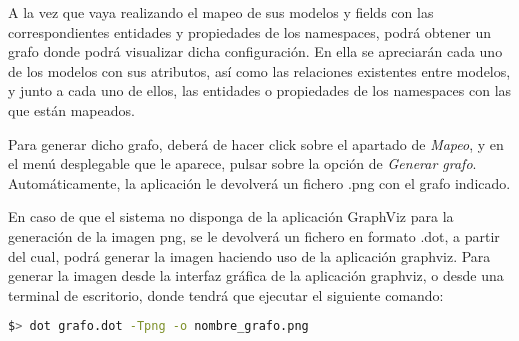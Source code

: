 A la vez que vaya realizando el mapeo de sus modelos y fields con las
correspondientes entidades y propiedades de los namespaces, podrá obtener un
grafo donde podrá visualizar dicha configuración. En ella se apreciarán cada uno
de los modelos con sus atributos, así como las relaciones existentes entre
modelos, y junto a cada uno de ellos, las entidades o propiedades de los
namespaces con las que están mapeados.

Para generar dicho grafo, deberá de hacer click sobre el apartado de
\textit{Mapeo}, y en el menú desplegable que le aparece, pulsar sobre la opción
de \textit{Generar grafo}. Automáticamente, la aplicación le devolverá un
fichero .png con el grafo indicado.

En caso de que el sistema no disponga de la aplicación GraphViz para la
generación de la imagen png, se le devolverá un fichero en formato .dot, a
partir del cual, podrá generar la imagen haciendo uso de la aplicación graphviz.
Para generar la imagen desde la interfaz gráfica de la aplicación graphviz, o
desde una terminal de escritorio, donde tendrá que ejecutar el siguiente
comando:

\begin{lstlisting}[frame=L, language=bash, basicstyle=\footnotesize]
$> dot grafo.dot -Tpng -o nombre_grafo.png
\end{lstlisting}


